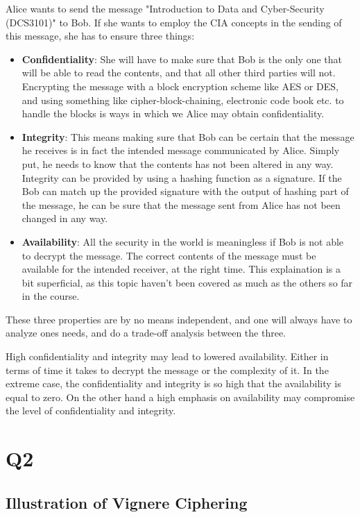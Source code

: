 \documentclass{article}
\begin{document}
Alice wants to send the message "Introduction to Data and Cyber-Security (DCS3101)" to Bob. If she wants to employ the CIA concepts in the sending of this message, she has to ensure three things:
\begin{itemize}
\item{\textbf{Confidentiality}: She will have to make sure that Bob is the only one that will be able to read the contents, and that all other third parties will not. Encrypting the message with a block encryption scheme like AES or DES, and using something like cipher-block-chaining, electronic code book etc. to handle the blocks is ways in which we Alice may obtain confidentiality.}
\item{\textbf{Integrity}: This means making sure that Bob can be certain that the message he receives is in fact the intended message communicated by Alice. Simply put, he needs to know that the contents has not been altered in any way. Integrity can be provided by using a hashing function as a signature. If the Bob can match up the provided signature with the output of hashing part of the message, he can be sure that the message sent from Alice has not been changed in any way.}
\item{\textbf{Availability}: All the security in the world is meaningless if Bob is not able to decrypt the message. The correct contents of the message must be available for the intended receiver, at the right time. This explaination is a bit superficial, as this topic haven't been covered as much as the others so far in the course. }
\end{itemize}

These three properties are by no means independent, and one will always have to analyze ones needs, and do a trade-off analysis between the three.

High confidentiality and integrity may lead to lowered availability. Either in terms of time it takes to decrypt the message or the complexity of it. In the extreme case, the confidentiality and integrity is so high that the availability is equal to zero. On the other hand a high emphasis on availability may compromise the level of confidentiality and integrity. 

\section{Q2}
\subsection{Illustration of Vignere Ciphering}
\end{document}
